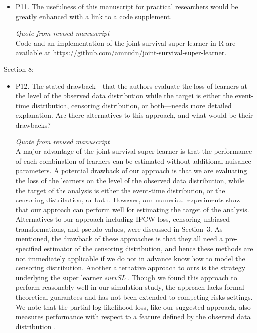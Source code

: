 \documentclass[a4paper,danish]{article}
\newcommand{\1}{\mathds{1}}
\newcommand{\qrev}[2]{
\vspace{.5em}
\begin{tcolorbox}[boxrule=0pt]
\hfill{\it\footnotesize Quote from revised manuscript#1}\\[.5em]
#2
\end{tcolorbox}
}
\newcommand{\answer}[1]{{\vspace{1em}{\bf #1}\vspace{1em}}}
\begin{document}
\begin{itemize}
\item P11. The usefulness of this manuscript for practical researchers
would be greatly enhanced with a link to a code supplement.

\answer{
Yes, we share our codes via a github repository.
Here is what we state at the end of the introduction
}
\qrev{}{

Code and an implementation of the joint survival super
learner in R \citep{R} are available at
\url{https://github.com/amnudn/joint-survival-super-learner}.
}
\end{itemize}


Section 8:

\begin{itemize}
\item P12. The stated drawback—that the authors evaluate the loss of
learners at the level of the observed data distribution while the
target is either the event-time distribution, censoring
distribution, or both—needs more detailed explanation. Are there
alternatives to this approach, and what would be their drawbacks?

  \answer{
  We have addressed the first part of your point in our answer to
  Reviewer 1's first point, please see above. Regarding alternative
  methods and their drawbacks, we do mention alternative approaches in
  Section 3, and we now reiterate and expand on these points in the
  Discussion, please see the paragraph below which we have added to the
  Discussion.
  }

  \qrev{}{
  A major advantage of the joint survival super learner is that the
performance of each combination of learners can be estimated without
additional nuisance parameters. A potential drawback of our approach
is that we are evaluating the loss of the learners on the level of the
observed data distribution, while the target of the analysis is either
the event-time distribution, or the censoring distribution, or
both. However, our numerical experiments show that our approach can
perform well for estimating the target of the analysis.  Alternatives
to our approach including IPCW loss, censoring unbiased
transformations, and pseudo-values, were discussed in Section~3. As mentioned, the drawback of these
approaches is that they all need a pre-specified estimator of the
censoring distribution, and hence these methods are not immediately
applicable if we do not in advance know how to model the censoring
distribution. Another alternative approach to ours is the strategy
underlying the super learner {\it survSL}
\citep{westling2021inference}. Though we found this approach to
perform reasonably well in our simulation study, the approach lacks
formal theoretical guarantees and has not been extended to competing
risks settings. We note that the partial log-likelihood loss, like our
suggested approach, also measures performance with respect to a
feature defined by the observed data distribution
\citep[e.g.,][]{hjort1992inference,whitney2019comment}.
}
\end{itemize}
\end{document}
